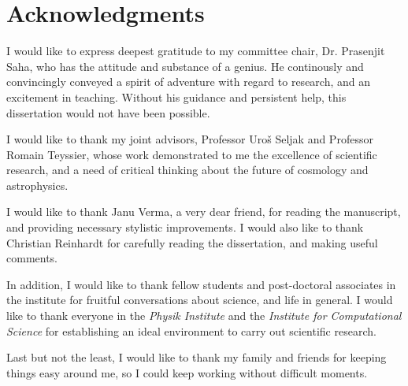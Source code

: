 {}

\chapter*{Acknowledgments}

I would like to express deepest gratitude to my committee chair,
Dr. Prasenjit Saha, who has the attitude and substance of a genius.
He continously and convincingly conveyed a spirit of adventure
with regard to research, and an excitement in teaching. 
Without his guidance and persistent help, this dissertation 
would not have been possible. 

I would like to thank my joint advisors, Professor Uro\v s Seljak and
Professor Romain Teyssier, whose work demonstrated to me the 
excellence of scientific research, and a need of critical thinking
about the future of cosmology and astrophysics.

I would like to thank Janu Verma, a very dear friend, for reading 
the manuscript, and providing necessary stylistic improvements. 
I would also like to thank Christian Reinhardt for carefully
reading the dissertation, and making useful comments.

In addition, I would like to thank fellow students and post-doctoral
associates in the institute for fruitful conversations about
science, and life in general. I would like to thank everyone
in the {\it Physik Institute} and the {\it Institute for Computational Science}
for establishing an ideal environment to carry out scientific research.

Last but not the least, I would like to thank my family and
friends for keeping things easy around me, so I could 
keep working without difficult moments.


